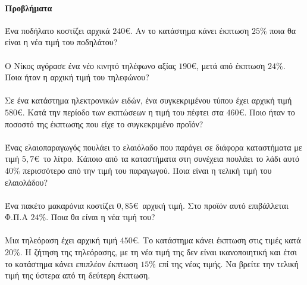 \documentclass[11pt,a4paper,modern]{FFExercises}
\begin{document}
\paragraph{Προβλήματα}
\askhsh Ένα ποδήλατο κοστίζει αρχικά $240$\euro. Αν το κατάστημα κάνει έκπτωση $25\%$ ποια θα είναι η νέα τιμή του ποδηλάτου?\\\\
\askhsh Ο Νίκος αγόρασε ένα νέο κινητό τηλέφωνο αξίας $190$\euro, μετά από έκπτωση $24\%$. Ποια ήταν η αρχική τιμή του τηλεφώνου?\\\\
\askhsh Σε ένα κατάστημα ηλεκτρονικών ειδών, ένα συγκεκριμένου τύπου  έχει αρχική τιμή $580$\euro. Κατά την περίοδο των εκπτώσεων η τιμή του πέφτει στα $460$\euro. Ποιο ήταν το ποσοστό της έκπτωσης που είχε το συγκεκριμένο προϊόν?\\\\
\askhsh Ένας ελαιοπαραγωγός πουλάει το ελαιόλαδο που παράγει σε διάφορα καταστήματα με τιμή $5{,}7$\euro\ το λίτρο. Κάποιο από τα καταστήματα στη συνέχεια πουλάει το λάδι αυτό $40\%$ περισσότερο από την τιμή του παραγωγού. Ποια είναι η τελική τιμή του ελαιολάδου?\\\\
\askhsh Ένα πακέτο μακαρόνια κοστίζει $0{,}85$\euro\ αρχική τιμή. Στο προϊόν αυτό επιβάλλεται Φ.Π.Α $24\%$. Ποια θα είναι η νέα τιμή του?\\\\
\askhsh Μια τηλεόραση έχει αρχική τιμή $450$\euro. Το κατάστημα κάνει έκπτωση στις τιμές κατά $20\%$. Η ζήτηση της τηλεόρασης, με τη νέα τιμή της δεν είναι ικανοποιητική και έτσι το κατάστημα κάνει επιπλέον έκπτωση $15\%$ επί της νέας τιμής. Να βρείτε την τελική τιμή της ύστερα από τη δεύτερη έκπτωση.\\\\
\askhsh 
\end{document}
